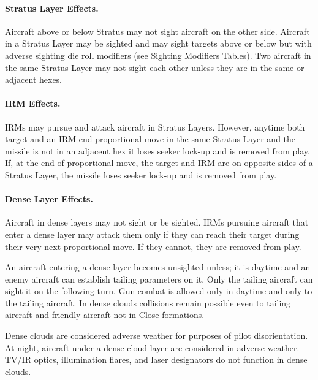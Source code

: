 \begin{advancedrules}
{\paragraph{Stratus Layer Effects.} Aircraft  above or below Stratus may not sight aircraft  on the other side. Aircraft in a Stratus Layer may be sighted and may sight targets above or below but with adverse sighting die roll modifiers (see Sighting Modifiers Tables). Two aircraft in the same Stratus Layer may not sight each other unless they are in the same or adjacent hexes. 

\paragraph{IRM Effects.} IRMs may pursue and attack aircraft in Stratus Layers. However, anytime both target and an IRM end  proportional move in the same Stratus Layer and the missile is not in an adjacent hex it loses seeker lock-up and is removed from play. If, at the end of  proportional move, the target and IRM are on opposite sides of a Stratus Layer, the missile loses seeker lock-up and is removed from play.

\paragraph{Dense Layer Effects.} Aircraft in dense layers may not sight or be sighted. IRMs pursuing aircraft that enter a dense layer may attack them only if they can reach their target during their very next proportional move. If they cannot, they are removed from play.

An aircraft entering a dense layer becomes unsighted unless; it is daytime and an enemy aircraft can establish tailing parameters on it. Only the tailing aircraft can sight it on the following turn. Gun combat is allowed only in daytime and only to the tailing aircraft. In dense clouds collisions remain possible even to tailing aircraft and friendly aircraft not in Close formations.

Dense clouds are considered adverse weather for purposes of pilot disorientation. At night, aircraft under a dense cloud layer are considered in adverse weather. TV/IR optics, illumination flares, and laser designators do not function in dense clouds.

}
\end{advancedrules}

